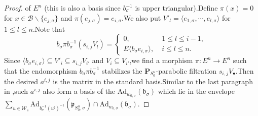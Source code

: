 \documentclass[10pt]{article}
\newtheorem{pro}[thm]{Proposition}
\newcommand{\bB}{{\mathbf{B}}}
\newcommand{\bP}{{\mathbf{P}}}
\newcommand{\cB}{\mathcal B}
\newcommand{\fb}{{\mathfrak{b}}}
\newcommand{\fp}{{\mathfrak{p}}}
\newcommand{\ft}{{\mathfrak{t}}}
\newcommand{\fz}{{\mathfrak{z}}}
\newcommand{\sW}{\mathscr W}
\begin{document}
\begin{proof}
of $E^n$ (this is also a basis since $b^{-1}_{\sigma}$ is upper triangular).\;Define $\pi(x)=0$ for $x\in \cB\backslash\{e_{j,\sigma}\}$ and $\pi(e_{j,\sigma})=e_{i,\sigma}$.\;We also put $V'_l=\langle e_{1,\sigma},\cdots,e_{l,\sigma}\rangle$ for $1\leq l\leq n$.\;Note that
\[b_{\sigma}\pi b^{-1}_{\sigma}(s_{i,j}V_{l})=\left\{
\begin{array}{ll}
	0,\;&1\leq l \leq i-1,\\
	E\langle b_{\sigma}e_{i,\sigma}\rangle,\;&i\leq l \leq n.
\end{array}
\right.\]
Since $\langle b_{\sigma}e_{i,\sigma}\rangle\subseteq V'_i\subseteq s_{i,j}V_{i'}$ and $V_i\subseteq V_{i'}$,\;we find a morphism $\pi:E^n\rightarrow E^n$ such that the endomorphism $b_{\sigma}\pi b^{-1}_{\sigma}$ stabilizes the $\bP_{S^u_0}$-parabolic filtration $s_{i,j}V_{\bullet}$.\;Then the desired $a^{i,j}$ is the matrix in the standard basis.\;Similar to the last paragraph in \cite[Lemma 2.1]{DensityHMS},\;such $a^{i,j}$ also form a basis of the $\mathrm{Ad}_{w_{0,\sigma}}(\fb_{\sigma})$ which lie in the envelope $\sum_{u\in \sW_s}\mathrm{Ad}_{b_{\sigma}^{-1}(u^{\sharp})^{-1}}(\fp_{S^u_0,\sigma})\cap \mathrm{Ad}_{w_{0,\sigma}}(\fb_{\sigma})$.\;
\end{proof}


\end{document}
